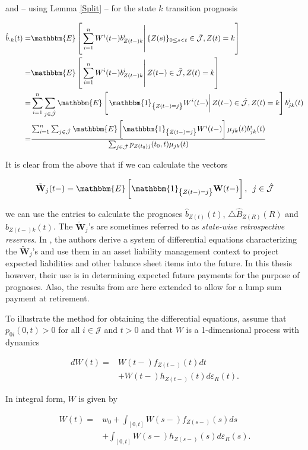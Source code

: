 \documentclass{book}
\newcommand{\1}[1]{\mathbbm{1}_{\left\lbrace #1 \right\rbrace}}
\newcommand{\expec}[1][def]{\mathbbm{E} \left[ #1 \right]}
\newcommand{\econd}[2][def]{\mathbbm{E} \left[ \left. #1 \right| #2 \right]}
\theoremstyle{break}
\theoremstyle{remark}
\numberwithin{equation}{section}
\begin{document}
and -- using Lemma \ref{Split} -- for the state $k$ transition prognosis

\begin{align*}
\hat{b}_{\cdot k}(t) =& \econd[\sum_{i=1}^n W^i(t-)b_{Z(t-)k}^i]{\{Z(s) \}_{0 \leq s < t} \in \bar{\mathcal{J}}, Z(t)=k} \\
=& \econd[\sum_{i=1}^n W^i(t-)b_{Z(t-)k}^i]{Z(t-) \in \bar{\mathcal{J}}, Z(t)=k} \\
=& \sum_{i=1}^n \sum_{j \in \hat{\mathcal{J}}} \econd[\1{Z(t-)=j} W^i(t-)]{Z(t-) \in \hat{\mathcal{J}}, Z(t) = k} b_{jk}^i(t) \\
=& \frac{\sum_{i=1}^n \sum_{j \in \hat{\mathcal{J}}} \expec[\1{Z(t-)=j} W^i(t-)] \mu_{jk}(t) b_{jk}^i(t)}{\sum_{j \in \hat{\mathcal{J}}} p_{Z(t_0)j}(t_0,t) \mu_{jk}(t)}
\end{align*}

It is clear from the above that if we can calculate the vectors

\begin{align*}
\tilde{\textbf{W}}_j(t-) = \expec[\1{Z(t-)=j} \textbf{W}(t-)], \, \, \, j \in \hat{\mathcal{J}}
\end{align*}


we can use the entries to calculate the prognoses $\hat{b}_{Z(t)}(t)$, $\triangle  \hat{B}_{Z(R)}(R)$ and $\hat{b}_{Z(t-)k}(t)$. The $\tilde{\textbf{W}}_j$'s are sometimes referred to as \textit{state-wise retrospective reserves}. In \cite{Lollike}, the authors derive a system of differential equations characterizing the $\tilde{\textbf{W}}_j$'s and use them in an asset liability management context to project expected liabilities and other balance sheet items into the future. In this thesis however, their use is in determining expected future payments for the purpose of prognoses. Also, the results from \cite{Lollike} are here extended to allow for a lump sum payment at retirement.

To illustrate the method for obtaining the differential equations, assume that $p_{0i}(0,t)>0$ for all $i \in \mathcal{J}$ and $t>0$ and that $W$ is a 1-dimensional process with dynamics


\begin{align*}
	dW(t) =& W(t-) f_{Z(t-)}(t) dt \\
	&+ W(t-) h_{Z(t-)}(t) d \varepsilon_{R}(t).
\end{align*}

In integral form, $W$ is given by

\begin{align*}
	W(t) =& w_0 + \int_{\left[ 0,t \right]} W(s-) f_{Z(s-)}(s) ds \\
	&+ \int_{\left[ 0,t \right]} W(s-) h_{Z(s-)}(s) d \varepsilon_{R}(s).
\end{align*}
\end{document}

